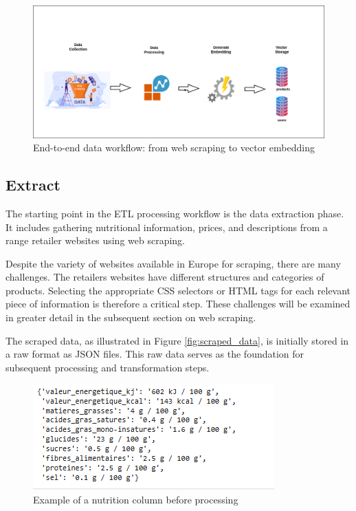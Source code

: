 \begin{center}
\begin{figure}[H]
    \includegraphics[scale=0.39]{images/workflow__data.png}
    \caption{End-to-end data workflow: from web scraping to vector embedding}
    \label{fig:data_workflow}
\end{figure}
\end{center}

\subsection{Extract}

\par The starting point in the ETL processing workflow is the data extraction phase. It includes gathering nutritional information, prices, and
descriptions from a range retailer websites using web scraping.
\par Despite the variety of websites available in Europe for scraping, there
are many challenges. The retailers websites have different structures and
categories of products. Selecting the appropriate CSS selectors or HTML
tags for each relevant piece of information is therefore a critical step.
These challenges will be examined in greater detail in the subsequent
section on web scraping.
\par The scraped data, as illustrated in Figure \ref{fig:scraped_data}, is initially stored in a raw format as JSON files. This raw data serves as the foundation for subsequent processing and transformation steps.
\begin{center}
\begin{figure}[H]
\centering
\includegraphics[scale=0.66]{images/nutrition.png}
\caption{Example of a nutrition column before processing} 
\label{fig:Nutrition_column}
\end{figure}
\end{center}


